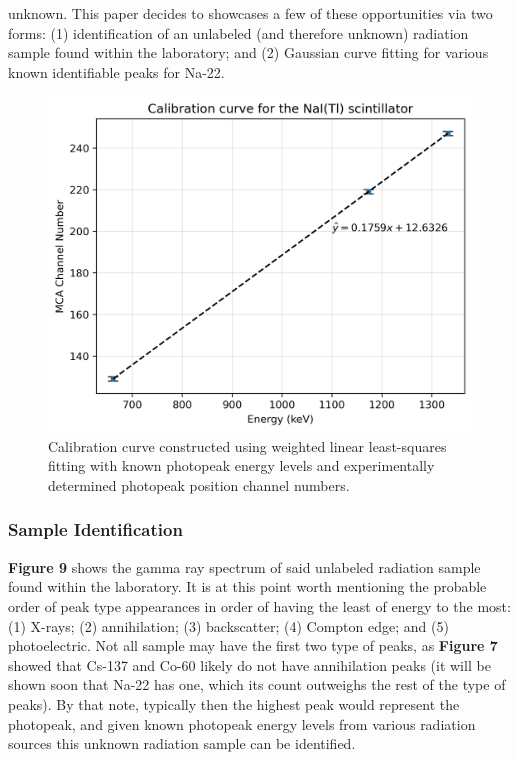 \documentclass[12pt]{article}
\begin{document}
\begin{multicols}{2}
\noindent
unknown.
This paper decides to showcases a few of these opportunities via two forms:
(1) identification of an unlabeled (and therefore unknown) radiation sample found
within the laboratory; and
(2) Gaussian curve fitting for various known identifiable peaks for Na-22.
\begin{figure}[H]
    \centering
    \includegraphics[width=0.98\linewidth]{figs/fig8.png}
    \caption{
        Calibration curve constructed using weighted linear least-squares fitting
        with known photopeak energy levels and experimentally determined photopeak
        position channel numbers.
    }
\end{figure}
\noindent
\subsubsection{Sample Identification}
\textbf{Figure 9} shows the gamma ray spectrum of said unlabeled radiation sample
found within the laboratory. It is at this point worth mentioning the probable
order of peak type appearances in order of having the least of energy to the
most: (1) X-rays; (2) annihilation; (3) backscatter; (4) Compton edge;
and (5) photoelectric. Not all sample may have the first two type of peaks,
as \textbf{Figure 7} showed that Cs-137 and Co-60 likely do not have 
annihilation peaks (it will be shown soon that Na-22 has one, which its count
outweighs the rest of the type of peaks). By that note,
typically then the highest peak would represent the photopeak, and given known
photopeak energy levels from various radiation sources this unknown radiation sample
can be identified.


\end{multicols}
\end{document}
